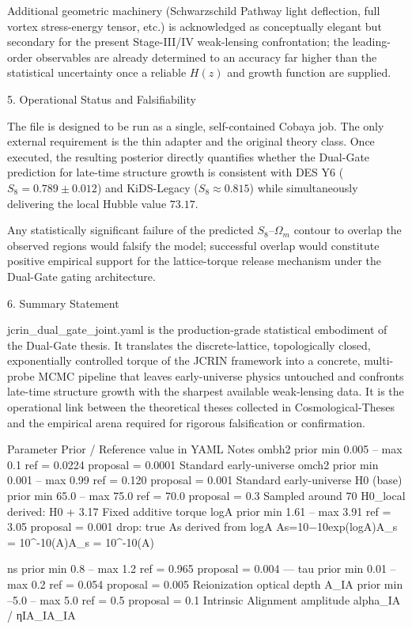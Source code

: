 Additional geometric machinery (Schwarzschild Pathway light deflection, full vortex stress-energy tensor, etc.) is acknowledged as conceptually elegant but secondary for the present Stage-III/IV weak-lensing confrontation; the leading-order observables are already determined to an accuracy far higher than the statistical uncertainty once a reliable \(H(z)\) and growth function are supplied.

5. Operational Status and Falsifiability

The file is designed to be run as a single, self-contained Cobaya job. The only external requirement is the thin adapter and the original theory class. Once executed, the resulting posterior directly quantifies whether the Dual-Gate prediction for late-time structure growth is consistent with DES Y6 (\(S_8 = 0.789\pm 0.012\)) and KiDS-Legacy (\(S_8\approx 0.815\)) while simultaneously delivering the local Hubble value \(73.17\).

Any statistically significant failure of the predicted \(S_8\)–\(\Omega_m\) contour to overlap the observed regions would falsify the model; successful overlap would constitute positive empirical support for the lattice-torque release mechanism under the Dual-Gate gating architecture.

6. Summary Statement

jcrin_dual_gate_joint.yaml is the production-grade statistical embodiment of the Dual-Gate thesis. It translates the discrete-lattice, topologically closed, exponentially controlled torque of the JCRIN framework into a concrete, multi-probe MCMC pipeline that leaves early-universe physics untouched and confronts late-time structure growth with the sharpest available weak-lensing data. It is the operational link between the theoretical theses collected in Cosmological-Theses and the empirical arena required for rigorous falsification or confirmation.

Parameter
Prior / Reference value in YAML
Notes
ombh2
prior min 0.005 – max 0.1
ref = 0.0224
proposal = 0.0001
Standard early-universe
omch2
prior min 0.001 – max 0.99
ref = 0.120
proposal = 0.001
Standard early-universe
H0 (base)
prior min 65.0 – max 75.0
ref = 70.0
proposal = 0.3
Sampled around 70
H0_local
derived: H0 + 3.17
Fixed additive torque
logA
prior min 1.61 – max 3.91
ref = 3.05
proposal = 0.001
drop: true
As
derived from logA
As=10−10exp⁡(log⁡A)A_s = 10^{-10}\exp(\log A)A_s = 10^{-10}\exp(\log A)

ns
prior min 0.8 – max 1.2
ref = 0.965
proposal = 0.004
—
tau
prior min 0.01 – max 0.2
ref = 0.054
proposal = 0.005
Reionization optical depth
A_IA
prior min –5.0 – max 5.0
ref = 0.5
proposal = 0.1
Intrinsic Alignment amplitude
alpha_IA / ηIA\eta_{\rm IA}\eta_{\rm IA}

